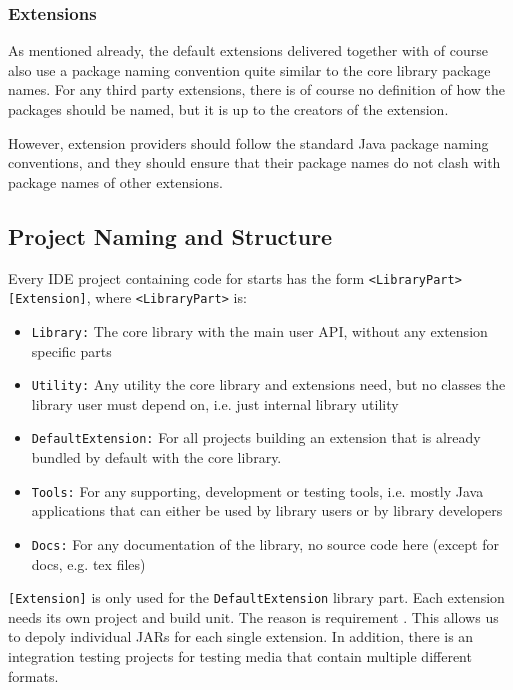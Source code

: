 \subsubsection{Extensions}%
\label{sec:Extensions}%

As mentioned already, the default extensions delivered together with \LibName{} of course also use a package naming convention quite similar to the core library package names. For any third party extensions, there is of course no definition of how the packages should be named, but it is up to the creators of the extension.

However, extension providers should follow the standard Java package naming conventions, and they should ensure that their package names do not clash with package names of other \LibName{} extensions.


\subsection{Project Naming and Structure}%
\label{sec:ProjectNamingandStructure}%

Every IDE project containing code for \LibName{} starts has the form \texttt{\LibName{}<LibraryPart>[Extension]}, where \texttt{<LibraryPart>} is:
\begin{itemize}
\item \texttt{Library:} The core library with the main user API, without any extension specific parts
\item \texttt{Utility:} Any utility the core library and extensions need, but no classes the library user must depend on, i.e. just internal library utility
\item \texttt{DefaultExtension:} For all projects building an extension that is already bundled by default with the core library.
\item \texttt{Tools:} For any supporting, development or testing tools, i.e. mostly Java applications that can either be used by library users or by library developers
\item \texttt{Docs:} For any documentation of the library, no source code here (except for docs, e.g. tex files)
\end{itemize}

\texttt{[Extension]} is only used for the \texttt{DefaultExtension} library part. Each extension needs its own project and build unit. The reason is requirement . This allows us to depoly individual JARs for each single extension. In addition, there is an integration testing projects for testing media that contain multiple different formats.

